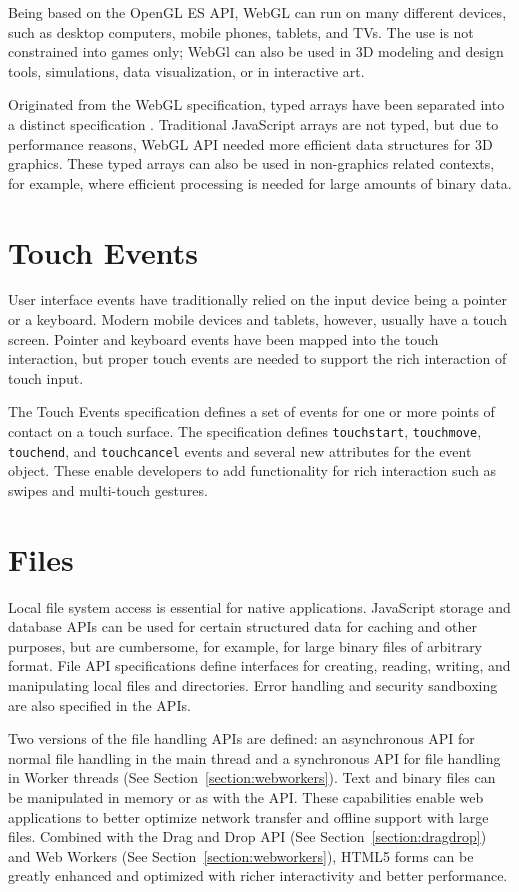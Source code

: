 Being based on the OpenGL ES API, WebGL can run on many different
devices, such as desktop computers, mobile phones, tablets, and
TVs. The use is not constrained into games only; WebGl can also be
used in 3D modeling and design tools, simulations, data visualization,
or in interactive art.

Originated from the WebGL specification, typed arrays have been
separated into a distinct specification
\cite{TypedArrays}. Traditional JavaScript arrays are not typed, but
due to performance reasons, WebGL API needed more efficient data
structures for 3D graphics. These typed arrays can also be used in
non-graphics related contexts, for example, where efficient processing
is needed for large amounts of binary data.

\section{Touch Events}

User interface events have traditionally relied on the input device
being a pointer or a keyboard. Modern mobile devices and tablets,
however, usually have a touch screen. Pointer and keyboard events have
been mapped into the touch interaction, but proper touch events are
needed to support the rich interaction of touch input.

The Touch Events specification \cite{touchevents} defines a set of
events for one or more points of contact on a touch surface. The
specification defines \texttt{touchstart}, \texttt{touchmove},
\texttt{touchend}, and \texttt{touchcancel} events and several new
attributes for the event object. These enable developers to add
functionality for rich interaction such as swipes and multi-touch
gestures.

\section{Files}
\label{section:fileapi}

Local file system access is essential for native
applications. JavaScript storage and database APIs can be used for
certain structured data for caching and other purposes, but are
cumbersome, for example, for large binary files of arbitrary
format. File API specifications \cite{FileAPI, FileAPIWriter,
  FileAPIDir} define interfaces for creating, reading, writing, and
manipulating local files and directories. Error handling and security
sandboxing are also specified in the APIs.

Two versions of the file handling APIs are defined: an asynchronous
API for normal file handling in the main thread and a synchronous API
for file handling in Worker threads (See
Section~\ref{section:webworkers}). Text and binary files can be
manipulated in memory or as   with the
 API. These capabilities enable web applications to better
optimize network transfer and offline support with large
files. Combined with the Drag and Drop API (See
Section~\ref{section:dragdrop}) and Web Workers (See
Section~\ref{section:webworkers}), HTML5 forms can be greatly enhanced
and optimized with richer interactivity and better performance.

